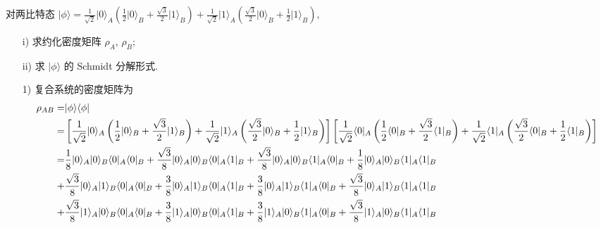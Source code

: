 \documentclass{assignment}
\begin{document}
\begin{prob}
    对两比特态 $\lvert\phi\rangle=\frac{1}{\sqrt{2}}\lvert 0\rangle_A\left(\frac{1}{2}\lvert 0\rangle_B+\frac{\sqrt{3}}{2}\lvert 1\rangle_B\right)+\frac{1}{\sqrt{2}}\lvert 1\rangle_A\left(\frac{\sqrt{3}}{2}\lvert 0\rangle_B+\frac{1}{2}\lvert 1\rangle_B\right)$,
    \begin{itemize}
        \item[i)] 求约化密度矩阵 $\rho_A$, $\rho_B$;
        \item[ii)] 求 $\lvert\phi\rangle$ 的 Schmidt 分解形式.
    \end{itemize}
\end{prob}
\begin{sol}
    \begin{itemize}
        \item[1)] 复合系统的密度矩阵为
        {\scriptsize
        \begin{align}
            \notag\rho_{AB}=&\lvert\phi\rangle\langle\phi\rvert\\
            \notag=&\left[\frac{1}{\sqrt{2}}\lvert 0\rangle_A\left(\frac{1}{2}\lvert 0\rangle_B+\frac{\sqrt{3}}{2}\lvert 1\rangle_B\right)+\frac{1}{\sqrt{2}}\lvert 1\rangle_A\left(\frac{\sqrt{3}}{2}\lvert 0\rangle_B+\frac{1}{2}\lvert 1\rangle_B\right)\right]\left[\frac{1}{\sqrt{2}}\langle 0\rvert_A\left(\frac{1}{2}\langle 0\rvert_B+\frac{\sqrt{3}}{2}\langle 1\rvert_B\right)+\frac{1}{\sqrt{2}}\langle 1\rvert_A\left(\frac{\sqrt{3}}{2}\langle 0\rvert_B+\frac{1}{2}\langle 1\rvert_B\right)\right]\\
            \notag=&\frac{1}{8}\lvert 0\rangle_A\lvert 0\rangle_B\langle 0\rvert_A\langle 0\rvert_B+\frac{\sqrt{3}}{8}\lvert 0\rangle_A\lvert 0\rangle_B\langle 0\rvert_A\langle 1\rvert_B+\frac{\sqrt{3}}{8}\lvert 0\rangle_A\lvert 0\rangle_B\langle 1\rvert_A\langle 0\rvert_B+\frac{1}{8}\lvert 0\rangle_A\lvert 0\rangle_B\langle 1\rvert_A\langle 1\rvert_B\\
            \notag+&\frac{\sqrt{3}}{8}\lvert 0\rangle_A\lvert 1\rangle_B\langle 0\rvert_A\langle 0\rvert_B+\frac{3}{8}\lvert 0\rangle_A\lvert 1\rangle_B\langle 0\rvert_A\langle 1\rvert_B+\frac{3}{8}\lvert 0\rangle_A\lvert 1\rangle_B\langle 1\rvert_A\langle 0\rvert_B+\frac{\sqrt{3}}{8}\lvert 0\rangle_A\lvert 1\rangle_B\langle 1\rvert_A\langle 1\rvert_B\\
            \notag+&\frac{\sqrt{3}}{8}\lvert 1\rangle_A\lvert 0\rangle_B\langle 0\rvert_A\langle 0\rvert_B+\frac{3}{8}\lvert 1\rangle_A\lvert 0\rangle_B\langle 0\rvert_A\langle 1\rvert_B+\frac{3}{8}\lvert 1\rangle_A\lvert 0\rangle_B\langle 1\rvert_A\langle 0\rvert_B+\frac{\sqrt{3}}{8}\lvert 1\rangle_A\lvert 0\rangle_B\langle 1\rvert_A\langle 1\rvert_B\\

\end{align}}
\end{itemize}
\end{sol}
\end{document}
